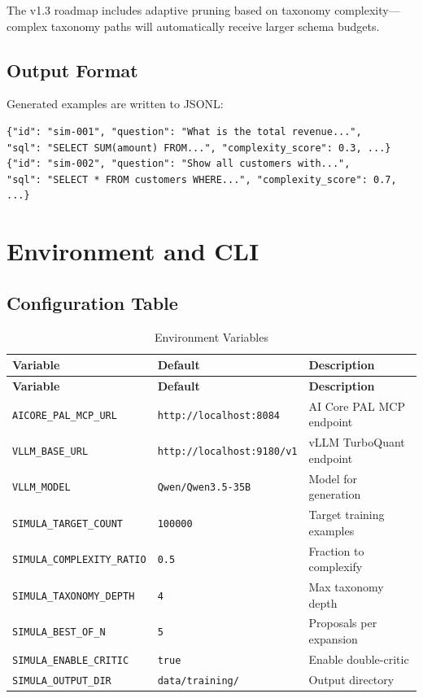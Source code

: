 \documentclass[12pt,a4paper,twoside]{report}
\begin{document}
\noindent
The v1.3 roadmap includes adaptive pruning based on taxonomy complexity---complex
taxonomy paths will automatically receive larger schema budgets.

\section{Output Format}

Generated examples are written to JSONL:

\begin{lstlisting}[language=jsonx,caption={JSONL output format}]
{"id": "sim-001", "question": "What is the total revenue...",
"sql": "SELECT SUM(amount) FROM...", "complexity_score": 0.3, ...}
{"id": "sim-002", "question": "Show all customers with...",
"sql": "SELECT * FROM customers WHERE...", "complexity_score": 0.7, ...}
\end{lstlisting}

\newpage
\chapter{Environment and CLI}
\label{chap:config}

\section{Configuration Table}

\begin{longtable}{p{5cm}p{3cm}p{6cm}}
\caption{Environment Variables} \\
\toprule
\textbf{Variable} & \textbf{Default} & \textbf{Description} \\
\midrule
\endfirsthead
\toprule
\textbf{Variable} & \textbf{Default} & \textbf{Description} \\
\midrule
\endhead
\texttt{AICORE\_PAL\_MCP\_URL} & \texttt{http://localhost:8084} & AI Core PAL MCP endpoint \\
\texttt{VLLM\_BASE\_URL} & \texttt{http://localhost:9180/v1} & vLLM TurboQuant endpoint \\
\texttt{VLLM\_MODEL} & \texttt{Qwen/Qwen3.5-35B} & Model for generation \\
\texttt{SIMULA\_TARGET\_COUNT} & \texttt{100000} & Target training examples \\
\texttt{SIMULA\_COMPLEXITY\_RATIO} & \texttt{0.5} & Fraction to complexify \\
\texttt{SIMULA\_TAXONOMY\_DEPTH} & \texttt{4} & Max taxonomy depth \\
\texttt{SIMULA\_BEST\_OF\_N} & \texttt{5} & Proposals per expansion \\
\texttt{SIMULA\_ENABLE\_CRITIC} & \texttt{true} & Enable double-critic \\
\texttt{SIMULA\_OUTPUT\_DIR} & \texttt{data/training/} & Output directory \\
\bottomrule
\end{longtable}
\end{document}
